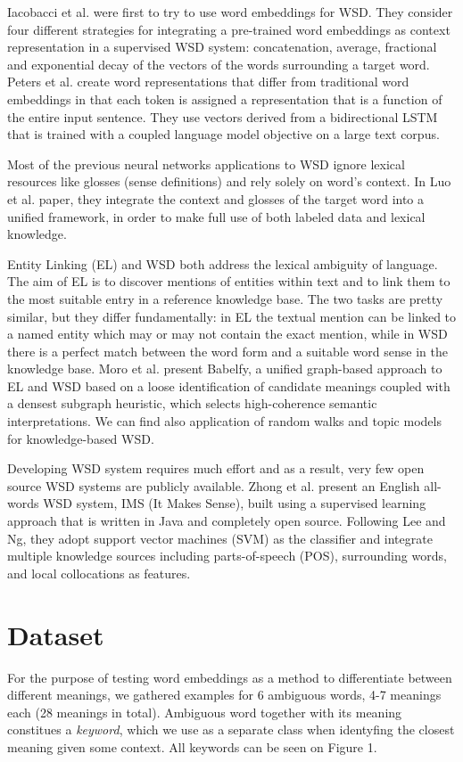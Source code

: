 \documentclass{llncs}
\begin{document}
Iacobacci et al.\cite{embeddingsforWSD} were first to try to use word embeddings for WSD. They consider four different strategies for integrating a pre-trained word embeddings as context representation in a supervised WSD system: concatenation, average, fractional and exponential decay of the vectors of the words surrounding a target word.
Peters et al.\cite{deepcontext} create word representations that differ from traditional word embeddings in that each token is assigned a representation that is a function of the entire input sentence. They use vectors derived from a bidirectional LSTM that is trained with a coupled language model objective on a large text corpus.

Most of the previous neural networks applications to WSD ignore lexical resources like glosses (sense definitions) and rely solely on word's context. In Luo et al.\cite{glosses} paper, they integrate the context and glosses of the target word into a unified framework, in order to make full use of both labeled data and lexical knowledge.

Entity Linking (EL) and WSD both address the lexical ambiguity of language. The aim of EL is to discover mentions of entities within text and to link them to the most suitable entry in a reference knowledge base. The two tasks are pretty similar, but they differ fundamentally: in EL the textual mention can be linked to a named entity which may or may not contain the exact mention, while in WSD there is a perfect match between the word form and a suitable word sense in the knowledge base.
Moro et al.\cite{babelfy} present Babelfy, a unified graph-based approach to EL and WSD based on a loose identification of candidate meanings coupled with a densest subgraph heuristic, which selects high-coherence semantic interpretations.
We can find also application of random walks\cite{randomwalks} and topic models\cite{topicmodels} for knowledge-based WSD.

Developing WSD system requires much effort and as a result, very few open source WSD systems are publicly available. Zhong et al.\cite{itmakessense} present an English all-words WSD system, IMS (It Makes Sense), built using a supervised learning approach that is written in Java and completely open source. Following Lee and Ng\cite{SVMtoWSD}, they adopt support vector machines (SVM) as the classifier and integrate multiple knowledge sources including parts-of-speech (POS), surrounding words, and local collocations as features.

\section{Dataset}
\label{dataset}
For the purpose of testing word embeddings as a method to differentiate between different meanings, we gathered examples for 6 ambiguous words, 4-7 meanings each (28 meanings in total).
Ambiguous word together with its meaning constitues a \textit{keyword}, which we use as a separate class when identyfing the closest meaning given some context.
All keywords can be seen on Figure 1.
\end{document}
